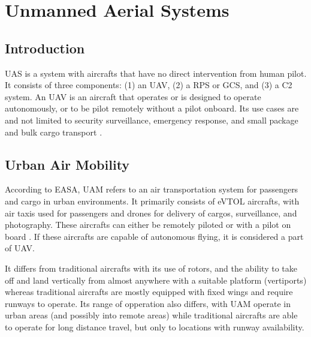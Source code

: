\section{Unmanned Aerial Systems}

\subsection{Introduction}

\Gls{UAS} is a system with aircrafts that have no direct intervention from human pilot.
It consists of three components: (1) an \gls{UAV}, (2) a \gls{RPS} or \gls{GCS}, and (3) a \gls{C2} system.
An \gls{UAV} is an aircraft that operates or is designed to operate autonomously, or to be pilot remotely without a pilot onboard.
Its use cases are and not limited to security surveillance, emergency response, and small package and bulk cargo transport \cite{skybrary_uas}. 


\subsection{Urban Air Mobility}

According to \gls{EASA}, \gls{UAM} refers to an air transportation system for passengers and cargo in urban environments.%
It primarily consists of \gls{eVTOL} aircrafts, with air taxis used for passengers and drones for delivery of cargos, surveillance, and photography. 
These aircrafts can either be remotely piloted or with a pilot on board \cite{easa_uam}. 
If these aircrafts are capable of autonomous flying, it is considered a part of \gls{UAV}.

It differs from traditional aircrafts with its use of rotors, and the ability to take off and land vertically from almost anywhere with a suitable platform (vertiports) whereas traditional aircrafts are mostly equipped with fixed wings and require runways to operate.
Its range of opperation also differs, with \gls{UAM} operate in urban areas (and possibly into remote areas) while traditional aircrafts are able to operate for long distance travel, but only to locations with runway availability.

